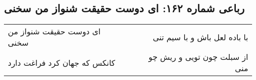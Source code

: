 \begin{center}
\section*{رباعی شماره ۱۶۲: ای دوست حقیقت شنواز من سخنی}
\label{sec:sh162}
\begin{longtable}{l p{0.5cm} r}
ای دوست حقیقت شنواز من سخنی
&&
با باده لعل باش و با سیم تنی
\\
کانکس که جهان کرد فراغت دارد
&&
از سبلت چون تویی و ریش چو منی
\\
\end{longtable}
\end{center}
